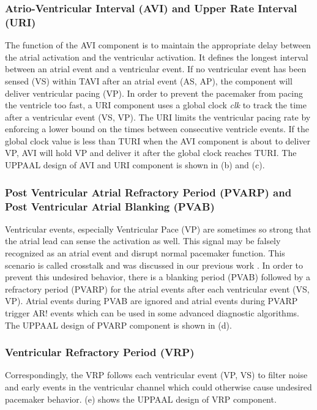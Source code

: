 \subsubsection{Atrio-Ventricular Interval (AVI) and Upper Rate Interval (URI)}
The function of the AVI component is to maintain the appropriate delay between the atrial activation and the ventricular activation. It defines the longest interval between an atrial event and a ventricular event. If no ventricular event has been sensed \textsf{(VS)} within TAVI after an atrial event \textsf{(AS, AP)}, the component will deliver ventricular pacing \textsf{(VP)}. In order to prevent the pacemaker from pacing the ventricle too fast, a URI component uses a global clock \emph{clk} to track the time after a ventricular event \textsf{(VS, VP)}. The URI limits the ventricular pacing rate by enforcing a lower bound on the times between consecutive ventricle events. If the global clock value is less than TURI when the AVI component is about to deliver \textsf{VP}, AVI will hold VP and deliver it after the global clock reaches TURI. The UPPAAL design of AVI and URI component is shown in (b) and (c).%

\subsubsection{Post Ventricular Atrial Refractory Period (PVARP) and Post Ventricular Atrial Blanking (PVAB)}
Ventricular events, especially Ventricular Pace (VP) are sometimes so strong that the atrial lead can sense the activation as well. This signal may be falsely recognized as an atrial event and disrupt normal pacemaker function. This scenario is called crosstalk and was discussed in our previous work \cite{vhm_embc11}. In order to prevent this undesired behavior, there is a blanking period (PVAB) followed by a refractory period (PVARP) for the atrial events after each ventricular event \textsf{(VS, VP)}. Atrial events during PVAB are ignored and atrial events during PVARP trigger \textsf{AR!} events which can be used in some advanced diagnostic algorithms. The UPPAAL design of PVARP component is shown in (d).

\subsubsection{Ventricular Refractory Period (VRP)}
Correspondingly, the VRP follows each ventricular event \textsf{(VP, VS)} to filter noise and early events in the ventricular channel which could otherwise cause undesired pacemaker behavior. (e) shows the UPPAAL design of VRP component.


